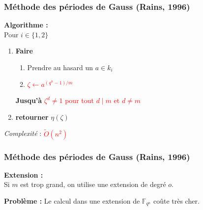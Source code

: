 \documentclass{beamer} %
\numberwithin{equation}{section}
\newcommand\GF[1]{\mathbb{F}_{#1}}
\newcommand\Tr[1]{\textup{Tr}\left(#1\right)}
\newcommand\tO[1]{\widetilde{O}(#1)}
\begin{document}
\begin{frame}
\frametitle{Méthode des périodes de Gauss (Rains, 1996)}
\textbf{Algorithme :}\\
\vspace{0.3cm}
Pour $i\in\lbrace{1,2}\rbrace$\\
\begin{enumerate}
\item \textbf{Faire}
\begin{enumerate}
	\item Prendre au hasard un $a\in k_i$
	\item \textcolor{red}{$\zeta \leftarrow a^{(q^n-1)/m}$}
\end{enumerate}
\textbf{Jusqu'à} \textcolor{red}{$\zeta^d\neq1$ pour tout $d\mid m$ et 
$d\neq m$}
\item \textbf{retourner} $\eta(\zeta)$
\end{enumerate}

\vspace{0.5cm}
\emph{Complexité} : \textcolor{red}{$\tO{n^2}$}\\
\end{frame}
\begin{frame}[fragile]
\frametitle{Méthode des périodes de Gauss (Rains, 1996)}
\textbf{Extension :}\\
Si $m$ est trop grand, on utilise une extension de degré $o$.
\begin{center}
\end{center}
\vspace{0.3cm}
\textbf{Problème :} Le calcul dans une extension de $\GF{q^n}$ coûte très cher.
\end{frame}
\end{document}

